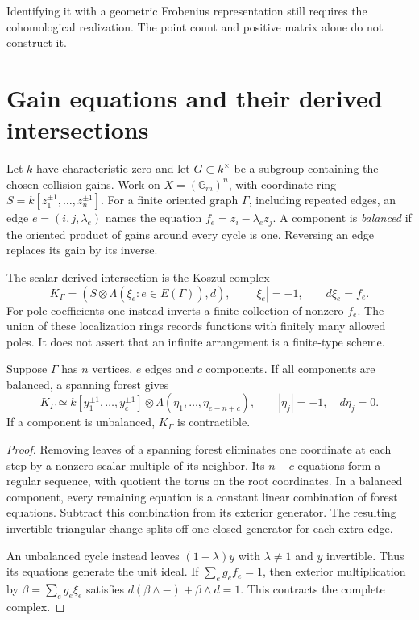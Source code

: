Identifying it with a geometric Frobenius
representation still requires the cohomological realization.
The point count and positive matrix alone do not construct it.

\section{Gain equations and their derived intersections}
\label{v4-arith:curve:sec:gains}

Let $k$ have characteristic zero and let $G\subset k^\times$ be
a subgroup containing the chosen collision gains. Work on
$X=(\mathbb G_m)^n$, with coordinate ring
$S=k[z_1^{\pm1},\ldots,z_n^{\pm1}]$.
For a finite oriented graph $\Gamma$, including repeated edges,
an edge $e=(i,j,\lambda_e)$ names the equation
$f_e=z_i-\lambda_ez_j$. A component is \emph{balanced} if the
oriented product of gains around every cycle is one. Reversing
an edge replaces its gain by its inverse.

The scalar derived intersection is the Koszul complex
\begin{equation}\label{v4-arith:curve:eq:gain-complex}
 K_\Gamma=(S\otimes\Lambda(\xi_e:e\in E(\Gamma)),d),
 \qquad |\xi_e|=-1,\qquad d\xi_e=f_e.
\end{equation}
For pole coefficients one instead inverts a finite collection
of nonzero $f_e$. The union of these localization rings records
functions with finitely many allowed poles. It does not assert
that an infinite arrangement is a finite-type scheme.

\begin{theorem}\label{v4-arith:curve:thm:gains}
Suppose $\Gamma$ has $n$ vertices, $e$ edges and $c$ components.
If all components are balanced, a spanning forest gives
\[
 K_\Gamma\simeq
 k[y_1^{\pm1},\ldots,y_c^{\pm1}]
     \otimes\Lambda(\eta_1,\ldots,\eta_{e-n+c}),
 \qquad |\eta_j|=-1,\quad d\eta_j=0.
\]
If a component is unbalanced, $K_\Gamma$ is contractible.
\end{theorem}
\begin{proof}
Removing leaves of a spanning forest eliminates one coordinate
at each step by a nonzero scalar multiple of its neighbor.
Its $n-c$ equations form a regular sequence, with quotient the
torus on the root coordinates. In a balanced component, every
remaining equation is a constant linear combination of forest
equations. Subtract this combination from its exterior generator.
The resulting invertible triangular change splits off one closed
generator for each extra edge.

An unbalanced cycle instead leaves $(1-\lambda)y$ with
$\lambda\ne1$ and $y$ invertible. Thus its equations generate
the unit ideal. If $\sum_eg_ef_e=1$, then exterior multiplication
by $\beta=\sum_eg_e\xi_e$ satisfies $d(\beta\wedge-)+\beta\wedge d=1$.
This contracts the complete complex.
\end{proof}

